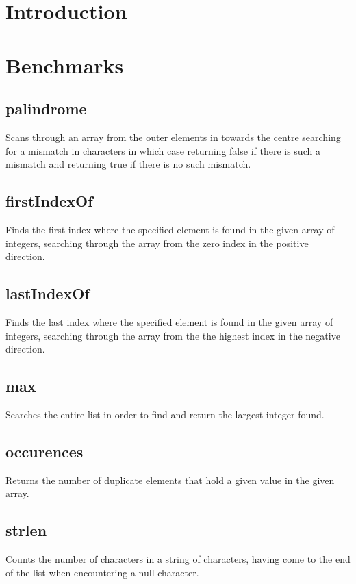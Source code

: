 \documentclass[10pt]{article} %
\begin{document}
\section{Introduction}

\section{Benchmarks}

\subsection{palindrome} 
Scans through an array from the outer elements in towards the centre searching for a mismatch in characters in which case returning false if there is such a mismatch and returning true if there is no such mismatch.

\subsection{firstIndexOf}
Finds the first index where the specified element is found in the given array of integers, searching through the array from the zero index in the positive direction.

\subsection{lastIndexOf}
Finds the last index where the specified element is found in the given array of integers, searching through the array from the the highest index in the negative direction.

\subsection{max}
Searches the entire list in order to find and return the largest integer found.

\subsection{occurences}
Returns the number of duplicate elements that hold a given value in the given array.

\subsection{strlen}
Counts the number of characters in a string of characters, having come to the end of the list when encountering a null character.

\end{document}

